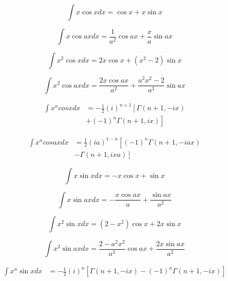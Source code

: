 \documentclass[../main.tex]{subfiles}
\begin{document}
\begin{equation*}
    \int x \cos x dx = \cos x + x \sin x 
    \end{equation*}
    
    \begin{equation*}
    \int x \cos ax dx = \frac{1}{a^2} \cos ax + \frac{x}{a} \sin ax 
    \end{equation*}
    
    \begin{equation*}
    \int x^2 \cos x dx = 2 x \cos x + \left ( x^2 - 2 \right ) \sin x 
    \end{equation*}
    
    \begin{equation*}
    \int x^2 \cos ax dx = \frac{2 x \cos ax }{a^2} + \frac{ a^2 x^2 - 2  }{a^3} \sin ax 
    \end{equation*}
    
    \begin{align*}
    \int  x^n cos x dx &= 
    -\frac{1}{2}(i)^{n+1}\left [ \Gamma(n+1, -ix) 
    \right . \nonumber \\ & \left .
    + (-1)^n \Gamma(n+1, ix)\right] 
    \end{align*}
    
    \begin{align*}
    \int x^n cos ax dx &=
     \frac{1}{2}(ia)^{1-n}\left [ (-1)^n  \Gamma(n+1, -iax) 
     \right. \nonumber \\ & \left.
     -\Gamma(n+1, ixa)\right] 
    \end{align*}
    
    \begin{equation*}
    \int x \sin x dx = -x \cos x + \sin x 
    \end{equation*}
    
    \begin{equation*}
    \int x \sin ax dx = -\frac{x \cos ax}{a} + \frac{\sin ax}{a^2} 
    \end{equation*}
    
    \begin{equation*}
    \int x^2 \sin x dx = \left(2-x^2\right) \cos x + 2 x \sin x
    \end{equation*}
    
    \begin{equation*}
    \int x^2 \sin ax dx =\frac{2-a^2x^2}{a^3}\cos ax +\frac{ 2 x \sin ax}{a^2} 
    \end{equation*}
    
    \begin{align*}
    \int x^n \sin x dx &= -\frac{1}{2}(i)^n\left[ \Gamma(n+1, -ix) 
     - (-1)^n\Gamma(n+1, -ix)\right] 
    \end{align*}
\end{document}
